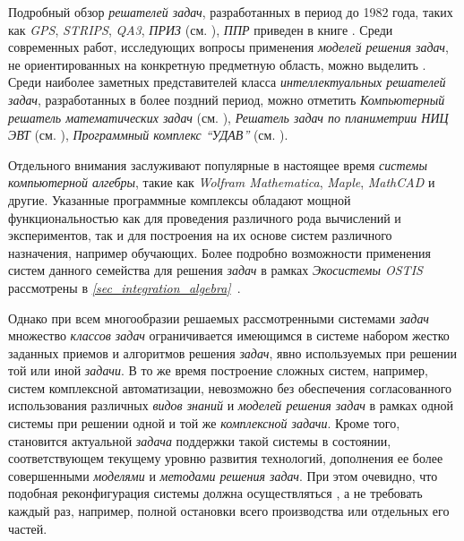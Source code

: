 Подробный обзор \textit{решателей задач}, разработанных в период до 1982 года, таких как \textit{GPS}, \textit{STRIPS}, \textit{QA3}, \textit{ПРИЗ} (см. ), \textit{ППР} приведен в книге . Среди современных работ, исследующих вопросы применения \textit{моделей решения задач}, не ориентированных на конкретную предметную область, можно выделить . Среди наиболее заметных представителей класса \textit{интеллектуальных решателей задач}, разработанных в более поздний период, можно отметить \textit{Компьютерный решатель математических задач} (см. ), \textit{Решатель задач по планиметрии НИЦ ЭВТ} (см. ), \textit{Программный комплекс ``УДАВ''} (см. ). 

Отдельного внимания заслуживают популярные в настоящее время \textit{системы компьютерной алгебры}, такие как \textit{Wolfram Mathematica}, \textit{Maple}, \textit{MathCAD} и другие. Указанные программные комплексы обладают мощной функциональностью как для проведения различного рода вычислений и экспериментов, так и для построения на их основе систем различного назначения, например обучающих. Более подробно возможности применения систем данного семейства для решения \textit{задач} в рамках \textit{Экосистемы OSTIS} рассмотрены в \textit{\ref{sec_integration_algebra}~}.

Однако при всем многообразии решаемых рассмотренными системами \textit{задач} множество \textit{классов задач} ограничивается имеющимся в системе набором жестко заданных приемов и алгоритмов решения \textit{задач}, явно используемых при решении той или иной \textit{задачи}. В то же время построение сложных систем, например, систем комплексной автоматизации, невозможно без обеспечения согласованного использования различных \textit{видов знаний} и \textit{моделей решения задач} в рамках одной системы при решении одной и той же \textit{комплексной задачи}. Кроме того, становится актуальной \textit{задача} поддержки такой системы в состоянии, соответствующем текущему уровню развития технологий, дополнения ее более совершенными \textit{моделями} и \textit{методами решения задач}. При этом очевидно, что подобная реконфигурация системы должна осуществляться , а не требовать каждый раз, например, полной остановки всего производства или отдельных его частей.

